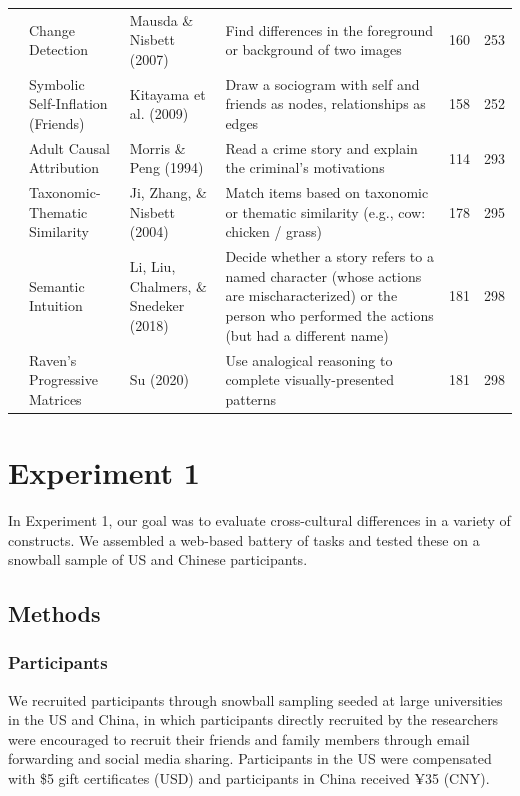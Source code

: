 \documentclass[
  man,floatsintext]{apa6}
\begin{document}
\begin{longtable}{l p{1.2in} p{1.4in} p{1.4in} p{.2in} p{.2in}}
& Change Detection & Mausda \& Nisbett (2007) & Find differences in the foreground or background of two images &  160 &  253\\

& Symbolic Self-Inflation (Friends) & Kitayama et al. (2009) & Draw a sociogram with self and friends as nodes, relationships as edges &  158 &  252\\

& Adult Causal Attribution & Morris \& Peng (1994) & Read a crime story and explain the criminal’s motivations &  114 &  293\\

& Taxonomic-Thematic Similarity & Ji, Zhang, \& Nisbett (2004) & Match items based on taxonomic or thematic similarity (e.g., cow: chicken / grass) & 178 &  295\\

& Semantic Intuition & Li, Liu, Chalmers, \& Snedeker (2018) & Decide whether a story refers to a named character (whose actions are mischaracterized) or the person who performed the actions (but had a different name) &  181 &  298\\

& Raven's Progressive Matrices & Su (2020) & Use analogical reasoning to complete visually-presented patterns &  181 &  298\\
    \hline
    \end{longtable}

\hypertarget{experiment-1}{%
\section{Experiment 1}\label{experiment-1}}

In Experiment 1, our goal was to evaluate cross-cultural differences in a variety of constructs. We assembled a web-based battery of tasks and tested these on a snowball sample of US and Chinese participants.

\hypertarget{methods}{%
\subsection{Methods}\label{methods}}

\hypertarget{participants}{%
\subsubsection{Participants}\label{participants}}

We recruited participants through snowball sampling seeded at large universities in the US and China, in which participants directly recruited by the researchers were encouraged to recruit their friends and family members through email forwarding and social media sharing. Participants in the US were compensated with \$5 gift certificates (USD) and participants in China received ¥35 (CNY).
\end{document}
